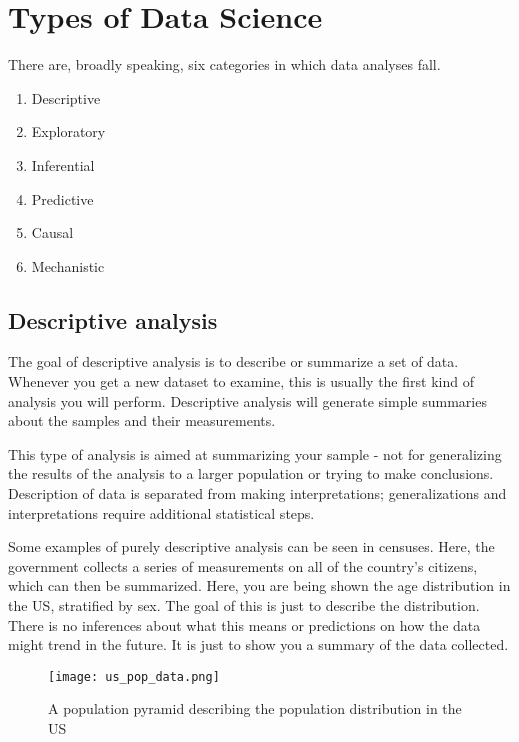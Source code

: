 \documentclass[11pt,fancy]{elegantbook}
\begin{document}
\section{Types of Data Science}
There are, broadly speaking, six categories in which data analyses fall.
\begin{enumerate}
    \item Descriptive
    \item Exploratory
    \item Inferential
    \item Predictive
    \item Causal
    \item Mechanistic
\end{enumerate}

\subsection{Descriptive analysis}
The goal of descriptive analysis is to describe or summarize a set of data. Whenever you get a new dataset to examine, this is usually the first kind of analysis you will perform. Descriptive analysis will generate simple summaries about the samples and their measurements.
\par This type of analysis is aimed at summarizing your sample - not for generalizing the results of the analysis to a larger population or trying to make conclusions. Description of data is separated from making interpretations; generalizations and interpretations require additional statistical steps.
\par Some examples of purely descriptive analysis can be seen in censuses. Here, the government collects a series of measurements on all of the country's citizens, which can then be summarized. Here, you are being shown the age distribution in the US, stratified by sex. The goal of this is just to describe the distribution. There is no inferences about what this means or predictions on how the data might trend in the future. It is just to show you a summary of the data collected.
\begin{figure}[H]
    \centering
    \texttt{[image: us\_pop\_data.png]}
    \caption{A population pyramid describing the population distribution in the US}
    \label{fig:us_pop_data}
\end{figure}
\end{document}

